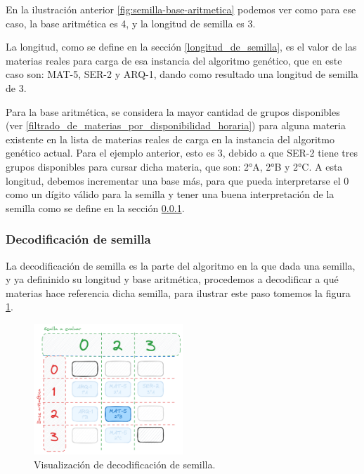 En la ilustración anterior \ref{fig:semilla-base-aritmetica} podemos ver como para ese caso, la base aritmética es 4, y la longitud de semilla es 3.

La longitud, como se define en la sección \ref{longitud_de_semilla}, es el valor de las materias reales para carga de esa instancia del algoritmo genético, que en este caso son: MAT-5, SER-2 y ARQ-1, dando como resultado una longitud de semilla de 3.

Para la base aritmética, se considera la mayor cantidad de grupos disponibles (ver \ref{filtrado_de_materias_por_disponibilidad_horaria}) para alguna materia existente en la lista de materias reales de carga en la instancia del algoritmo genético actual. Para el ejemplo anterior, esto es 3, debido a que SER-2 tiene tres grupos disponibles para cursar dicha materia, que son: 2°A, 2°B y 2°C. A esta longitud, debemos incrementar una base más, para que pueda interpretarse el 0 como un dígito válido para la semilla y tener una buena interpretación de la semilla como se define en la sección \ref{decodificacion_se_semilla}.

\subsubsection{Decodificación de semilla}\label{decodificacion_se_semilla}
La decodificación de semilla es la parte del algoritmo en la que dada una semilla, y ya defininido su longitud y base aritmética, procedemos a decodificar a qué materias hace referencia dicha semilla, para ilustrar este paso tomemos la figura \ref{fig:visualización_de_decodificación_de_semilla}.

\begin{figure}[h]
    \centering
    \includegraphics[width=0.5\textwidth]{images/seed-calc.png}
    \caption{Visualización de decodificación de semilla.}
    \label{fig:visualización_de_decodificación_de_semilla}
\end{figure}

